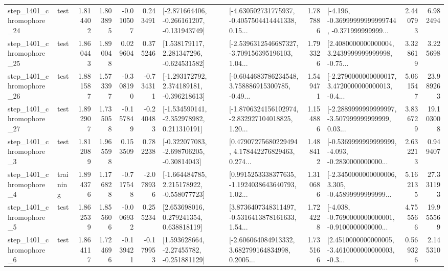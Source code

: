 \begin{tabular}{llrrrrllrlrr}
 step\_1401\_chromophore\_24 &      test &      1.814402 &    1.803895 &     -0.010507 &  0.243491 &  [-2.871664406, -0.266161207, -0.131943749] &  [-4.630502731775937, -0.4057504414441338, 0.15... &       1.787886 &  [-4.196, -0.36999999999999744, -0.371999999999... &            2.440793 &          6.982494 \\
 step\_1401\_chromophore\_25 &      test &      1.860443 &    1.890048 &      0.029604 &  0.375246 &    [1.538179117, 2.281347296, -0.624531582] &  [-2.5396312546687327, -3.709156395196103, 1.04... &       1.793326 &  [2.4080000000000004, 3.2439999999999998, -0.75... &            3.328619 &          3.225698 \\
 step\_1401\_chromophore\_26 &      test &      1.881587 &    1.573397 &     -0.308190 & -0.734311 &   [-1.293172792, 2.374189181, -0.396218613] &  [-0.6044683786234548, 3.758886915300785, -0.49... &       1.549471 &  [-2.2790000000000017, 3.4720000000000013, -0.4... &            5.061547 &         23.989263 \\
 step\_1401\_chromophore\_27 &      test &      1.892907 &    1.735058 &     -0.157849 & -0.240483 &   [-1.534590141, -2.352978982, 0.211310191] &  [-1.8706324156102974, -2.832927104018825, 1.20... &       1.154886 &  [-2.2889999999999997, -3.507999999999999, 0.03... &            3.836729 &         19.103008 \\
  step\_1401\_chromophore\_3 &      test &      1.812089 &    1.965598 &      0.153509 &  0.782238 &   [-0.322077083, -2.698706205, -0.30814043] &  [0.47907275680229494, 4.178442276829463, 0.274... &       1.488412 &  [-0.5369999999999999, -4.093, -0.2830000000000... &            2.632213 &          0.949407 \\
  step\_1401\_chromophore\_4 &  training &      1.894376 &    1.176828 &     -0.717548 & -2.078936 &   [-1.664484785, 2.215178922, -0.558077723] &  [0.9915253338377635, -1.1924038643640793, 1.02... &       1.310686 &  [-2.3450000000000006, 3.305, -0.45899999999999... &            5.162135 &         27.331193 \\
  step\_1401\_chromophore\_5 &      test &      1.862539 &    1.855606 &     -0.006932 &  0.255234 &     [2.653698016, 0.279241354, 0.638818119] &  [3.8736407348311497, -0.5316413878161633, 1.54... &       1.724228 &  [-4.038, -0.7690000000000001, -0.9100000000000... &            4.755566 &         19.955569 \\
  step\_1401\_chromophore\_6 &      test &      1.864117 &    1.724696 &     -0.139421 & -0.179953 &    [1.593628664, -2.27455782, -0.251881129] &  [-2.606064084913332, 3.682799164834998, 0.2005... &       1.735166 &  [2.4510000000000005, -3.4610000000000003, -0.3... &            0.569326 &          2.145310 \\

\end{tabular}

